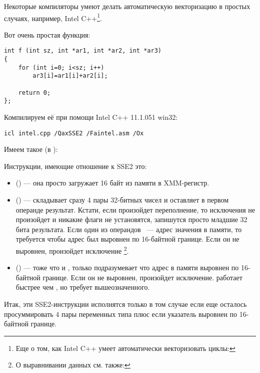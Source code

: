 Некоторые компиляторы умеют делать автоматическую векторизацию в простых случаях, 
например, Intel C++\footnote{Еще о том, как Intel C++ умеет автоматически векторизовать циклы: \URLINTELVEC}.

Вот очень простая функция:

\begin{lstlisting}
int f (int sz, int *ar1, int *ar2, int *ar3)
{
	for (int i=0; i<sz; i++)
		ar3[i]=ar1[i]+ar2[i];

	return 0;
};
\end{lstlisting}


Компилируем её при помощи Intel C++ 11.1.051 win32:

\begin{verbatim}
icl intel.cpp /QaxSSE2 /Faintel.asm /Ox
\end{verbatim}

Имеем такое (в \IDA):



Инструкции, имеющие отношение к SSE2 это:
\begin{itemize}
\item
\MOVDQU () --- она просто загружает 16 байт из памяти в XMM-регистр.

\item
\PADDD () --- складывает сразу 4 пары 32-битных чисел и оставляет в первом операнде результат. 
Кстати, если произойдет переполнение, то исключения не произойдет и никакие флаги не установятся, 
запишутся просто младшие 32 бита результата. 
Если один из операндов \PADDD ~--- адрес значения в памяти, 
то требуется чтобы адрес был выровнен по 16-байтной границе. Если он не выровнен, произойдет исключение
\footnote{О выравнивании данных см. также: \URLWPDA}.

\item
\MOVDQA () --- тоже что и \MOVDQU, только подразумевает 
что адрес в памяти выровнен по 16-байтной границе. 
Если он не выровнен, произойдет исключение. 
\MOVDQA работает быстрее чем \MOVDQU, но требует вышеозначенного.

\end{itemize}

Итак, эти SSE2-инструкции исполнятся только в том случае если еще осталось просуммировать 
4 пары переменных типа \Tint плюс если указатель  выровнен по 16-байтной границе.

